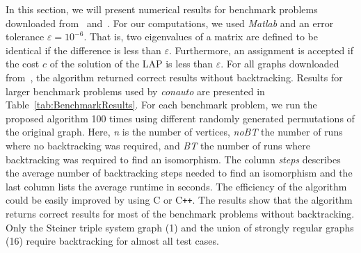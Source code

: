 \documentclass
[
    a4paper,
    DIV=11,
    abstracton
]
{scrartcl}
\theoremstyle{definition}
\begin{document}
In this section, we will present numerical results for benchmark problems downloaded from~\cite{Val11} and~\cite{LAC11a}. For our computations, we used \emph{Matlab} and an error tolerance $ \varepsilon = 10^{-6} $. That is, two eigenvalues of a matrix are defined to be identical if the difference is less than $ \varepsilon $. Furthermore, an assignment is accepted if the cost $ c $ of the solution of the LAP is less than $ \varepsilon $. For all graphs downloaded from~\cite{Val11}, the algorithm returned correct results without backtracking. Results for larger benchmark problems used by \emph{conauto} are presented in Table~\ref{tab:BenchmarkResults}. For each benchmark problem, we run the proposed algorithm 100 times using different randomly generated permutations of the original graph. Here, \emph{n} is the number of vertices, \emph{noBT} the number of runs where no backtracking was required, and \emph{BT} the number of runs where backtracking was required to find an isomorphism. The column \emph{steps} describes the average number of backtracking steps needed to find an isomorphism and the last column lists the average runtime in seconds. The efficiency of the algorithm could be easily improved by using C or C\texttt{++}. The results show that the algorithm returns correct results for most of the benchmark problems without backtracking. Only the Steiner triple system graph (1) and the union of strongly regular graphs (16) require backtracking for almost all test cases.
\end{document}

